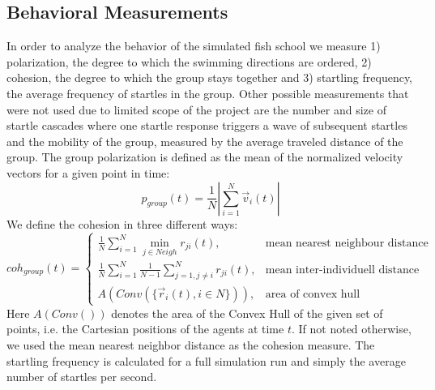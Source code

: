 \documentclass[a4paper,10pt,hidelinks]{scrreprt}
\begin{document}
	\subsection{Behavioral Measurements}
	In order to analyze the behavior of the simulated fish school we measure 1) polarization, the degree to which the swimming directions are ordered, 2) cohesion, the degree to which the group stays together and 3) startling frequency, the average frequency of startles in the group.
	Other possible measurements that were not used due to limited scope of the project are the number and size of startle cascades where one startle response triggers a wave of subsequent startles and the mobility of the group, measured by the average traveled distance of the group.
	The group polarization is defined as the mean of the normalized velocity vectors for a given point in time:
	\begin{equation}
		p_{group}(t) = \frac{1}{N} \left| \sum_{i=1}^{N} \vec{v}_i(t) \right|
		\label{eq:pol}
	\end{equation}
	We define the cohesion in three different ways:
	\begin{equation}
		coh_{group}(t) = \left\{\begin{array}{lc}
		\frac{1}{N} \sum\limits_{i=1}^{N} \min\limits_{j \in Neigh} r_{ji}(t) , & \text{mean nearest neighbour distance}\\[12pt]
		\frac{1}{N} \sum\limits_{i=1}^{N}\frac{1}{N-1} \sum\limits_{j=1, j\neq i}^{N} r_{ji}(t), & \text{mean inter-individuell distance}\\[12pt]
		A(Conv(\{\vec{r}_i(t), i \in N \})), & \text{area of convex hull}
		\end{array}\right.
		\label{eq:coh}
	\end{equation}
	Here $A(Conv())$ denotes the area of the Convex Hull of the given set of points, i.e. the Cartesian positions of the agents at time $t$.
	If not noted otherwise, we used the mean nearest neighbor distance as the cohesion measure.
	The startling frequency is calculated for a full simulation run and simply the average number of startles per second.
\end{document}
